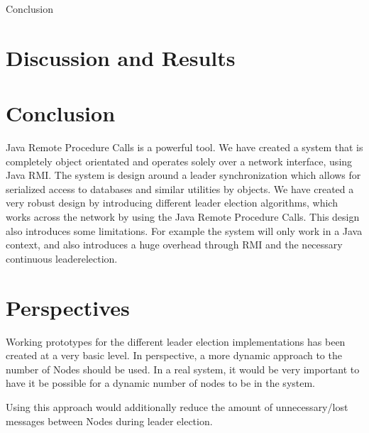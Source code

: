 {Conclusion}
\section{Discussion and Results}

\section{Conclusion}
Java Remote Procedure Calls is a powerful tool. We have created a system that is completely object orientated and operates solely over a network interface, using Java RMI. The system is design around a leader synchronization which allows for serialized access to databases and similar utilities by objects. We have created a very robust design by introducing different leader election algorithms, which works across the network by using the Java Remote Procedure Calls.
This design also introduces some limitations. For example the system will only work in a Java context, and also introduces a huge overhead through RMI and the necessary continuous leaderelection.


\section{Perspectives}
Working prototypes for the different leader election implementations has been created at a very basic level. In perspective, a more dynamic approach to the number of Nodes should be used. In a real system, it would be very important to have it be possible for a dynamic number of nodes to be in the system. 

Using this approach would additionally reduce the amount of unnecessary/lost messages between Nodes during leader election. 
